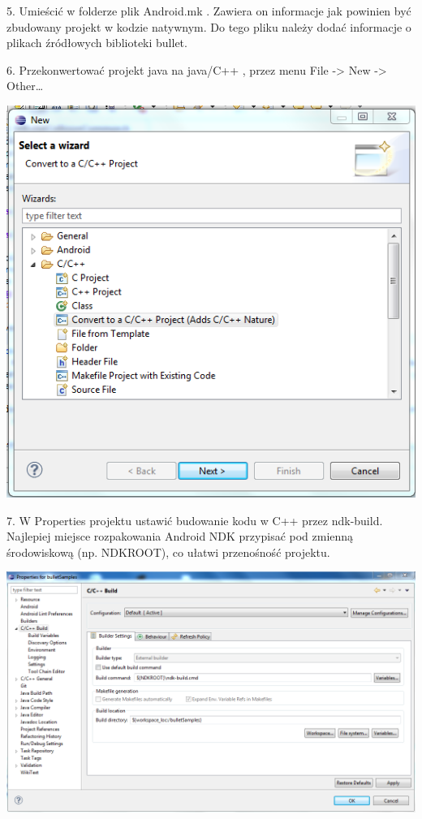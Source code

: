   5. Umieścić w folderze plik Android.mk . Zawiera on informacje jak powinien
  być zbudowany projekt w kodzie natywnym. Do tego pliku należy
  dodać informacje o plikach źródłowych biblioteki bullet.
  
  
  6. Przekonwertować projekt java na java/C++ , przez menu File -> New ->
  Other\ldots
  
  \includegraphics{./img/convert.png}
  
  7. W Properties projektu ustawić budowanie kodu w C++ przez ndk-build.
  Najlepiej miejsce rozpakowania Android NDK przypisać pod zmienną środowiskową
  (np. NDKROOT), co ułatwi przenośność projektu.
  
  \includegraphics[width=\textwidth]{./img/properties.png}
  
